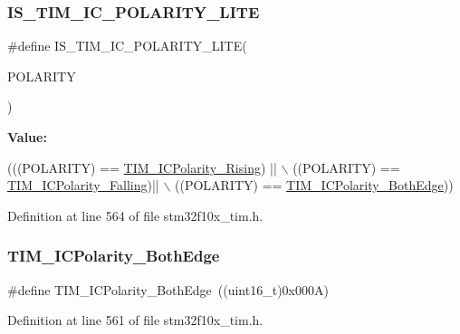 \subsubsection{\texorpdfstring{I\+S\+\_\+\+T\+I\+M\+\_\+\+I\+C\+\_\+\+P\+O\+L\+A\+R\+I\+T\+Y\+\_\+\+L\+I\+TE}{IS\_TIM\_IC\_POLARITY\_LITE}}
{\footnotesize\ttfamily \#define I\+S\+\_\+\+T\+I\+M\+\_\+\+I\+C\+\_\+\+P\+O\+L\+A\+R\+I\+T\+Y\+\_\+\+L\+I\+TE(\begin{DoxyParamCaption}\item[{}]{P\+O\+L\+A\+R\+I\+TY }\end{DoxyParamCaption})}

{\bfseries Value\+:}
\begin{DoxyCode}
(((POLARITY) == \hyperlink{group___t_i_m___input___capture___polarity_gabe598596b7dbcac446a4918105fa95a6}{TIM\_ICPolarity\_Rising}) || \(\backslash\)
                                           ((POLARITY) == \hyperlink{group___t_i_m___input___capture___polarity_ga70c6f5ed30a236bac4c690928e742243}{TIM\_ICPolarity\_Falling})|| \(\backslash\)
                                           ((POLARITY) == 
      \hyperlink{group___t_i_m___input___capture___polarity_ga4632a6425d407c0d28b610b2d31cccc8}{TIM\_ICPolarity\_BothEdge}))
\end{DoxyCode}


Definition at line 564 of file stm32f10x\+\_\+tim.\+h.

\mbox{\label{group___t_i_m___input___capture___polarity_ga4632a6425d407c0d28b610b2d31cccc8}} 
\subsubsection{\texorpdfstring{T\+I\+M\+\_\+\+I\+C\+Polarity\+\_\+\+Both\+Edge}{TIM\_ICPolarity\_BothEdge}}
{\footnotesize\ttfamily \#define T\+I\+M\+\_\+\+I\+C\+Polarity\+\_\+\+Both\+Edge~((uint16\+\_\+t)0x000\+A)}



Definition at line 561 of file stm32f10x\+\_\+tim.\+h.

